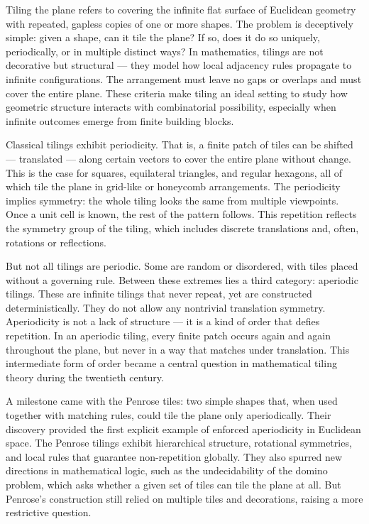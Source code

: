 Tiling the plane refers to covering the infinite flat surface of Euclidean geometry with repeated, gapless copies of one or more shapes. The problem is deceptively simple: given a shape, can it tile the plane? If so, does it do so uniquely, periodically, or in multiple distinct ways? In mathematics, tilings are not decorative but structural — they model how local adjacency rules propagate to infinite configurations. The arrangement must leave no gaps or overlaps and must cover the entire plane. These criteria make tiling an ideal setting to study how geometric structure interacts with combinatorial possibility, especially when infinite outcomes emerge from finite building blocks.

Classical tilings exhibit periodicity. That is, a finite patch of tiles can be shifted — translated — along certain vectors to cover the entire plane without change. This is the case for squares, equilateral triangles, and regular hexagons, all of which tile the plane in grid-like or honeycomb arrangements. The periodicity implies symmetry: the whole tiling looks the same from multiple viewpoints. Once a unit cell is known, the rest of the pattern follows. This repetition reflects the symmetry group of the tiling, which includes discrete translations and, often, rotations or reflections.

But not all tilings are periodic. Some are random or disordered, with tiles placed without a governing rule. Between these extremes lies a third category: aperiodic tilings. These are infinite tilings that never repeat, yet are constructed deterministically. They do not allow any nontrivial translation symmetry. Aperiodicity is not a lack of structure — it is a kind of order that defies repetition. In an aperiodic tiling, every finite patch occurs again and again throughout the plane, but never in a way that matches under translation. This intermediate form of order became a central question in mathematical tiling theory during the twentieth century.

A milestone came with the Penrose tiles: two simple shapes that, when used together with matching rules, could tile the plane only aperiodically. Their discovery provided the first explicit example of enforced aperiodicity in Euclidean space. The Penrose tilings exhibit hierarchical structure, rotational symmetries, and local rules that guarantee non-repetition globally. They also spurred new directions in mathematical logic, such as the undecidability of the domino problem, which asks whether a given set of tiles can tile the plane at all. But Penrose’s construction still relied on multiple tiles and decorations, raising a more restrictive question.

